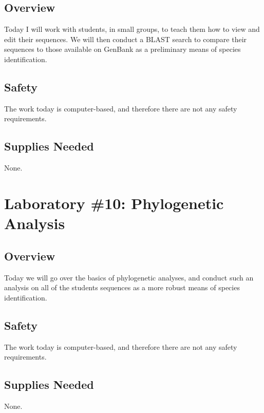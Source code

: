 \documentclass[12pt, hidelinks]{article}
\begin{document}
	\subsection{Overview}
	Today I will work with students, in small groups, to teach them how to view and edit their sequences. We will then conduct a BLAST search to compare their sequences to those available on GenBank as a preliminary means of species identification.
	
	
	\subsection{Safety}
	The work today is computer-based, and therefore there are not any safety requirements.
			
	
	\subsection{Supplies Needed}
	None.	


\newpage
\section{Laboratory \#10: Phylogenetic Analysis}


	\subsection{Overview}
	Today we will go over the basics of phylogenetic analyses, and conduct such an analysis on all of the students sequences as a more robust means of species identification.
	
	
	\subsection{Safety}
	The work today is computer-based, and therefore there are not any safety requirements.
			
	
	\subsection{Supplies Needed}
	None.	
\end{document}
